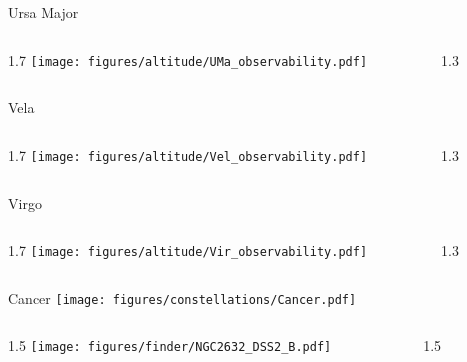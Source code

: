 \documentclass[final]{beamer}
\newlength{\colwidth}
\begin{document}
\begin{frame}[t]{}

    \Large{Ursa Major}
    \begin{columns}[T]
        \begin{column}{1.7\colwidth}
            \centering
            \texttt{[image: figures/altitude/UMa\_observability.pdf]}
        \end{column}
        \begin{column}{1.3\colwidth}
            \Large
            
        \end{column}
    \end{columns}

    \Large{Vela}
    \begin{columns}[T]
        \begin{column}{1.7\colwidth}
            \centering
            \texttt{[image: figures/altitude/Vel\_observability.pdf]}
        \end{column}
        \begin{column}{1.3\colwidth}
            \Large
            
        \end{column}
    \end{columns}

    \Large{Virgo}
    \begin{columns}[T]
        \begin{column}{1.7\colwidth}
            \centering
            \texttt{[image: figures/altitude/Vir\_observability.pdf]}
        \end{column}
        \begin{column}{1.3\colwidth}
            \Large
            
        \end{column}
    \end{columns}
\end{frame}

\begin{frame}[t]{\LARGE Cancer}
    \centering
    \texttt{[image: figures/constellations/Cancer.pdf]}
\end{frame}


\begin{frame}[t]{}
    \begin{columns}[T]
        \begin{column}{1.5\colwidth}
            \centering
            \texttt{[image: figures/finder/NGC2632\_DSS2\_B.pdf]}
        \end{column}
        \begin{column}{1.5\colwidth}
            \Large
            
        \end{column}
    \end{columns}
    \vspace{\fill}
\end{frame}
\end{document}
